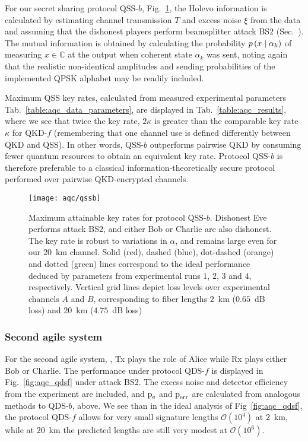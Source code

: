 For our secret sharing protocol QSS-$b$, Fig.~\ref{fig:aqc_qssb}, the Holevo information is calculated by estimating channel transmission $T$ and excess noise $\xi$ from the data and assuming that the dishonest players perform beamsplitter attack BS$2$ (Sec.~). The mutual information is obtained by calculating the probability $p\left(x \; \middle| \; \alpha_k\right)$ of measuring $x \in \mathbb{C}$ at the output when coherent state $\alpha_k$ was sent, noting again that the realistic non-identical amplitudes and sending probabilities of the implemented QPSK alphabet may be readily included.

Maximum QSS key rates, calculated from measured experimental parameters Tab.~\ref{table:aqc_data_parameters}, are displayed in Tab.~\ref{table:aqc_results}, where we see that twice the key rate, $2 \kappa$ is greater than the comparable key rate $\kappa$ for QKD-$f$ (remembering that one channel use is defined differently between QKD and QSS). In other words, QSS-$b$ outperforms pairwise QKD by consuming fewer quantum resources to obtain an equivalent key rate. Protocol QSS-$b$ is therefore preferable to a classical information-theoretically secure protocol performed over pairwise QKD-encrypted channels. 

\begin{figure}[htp]
\centering
\texttt{[image: aqc/qssb]}
\caption{\label{fig:aqc_qssb} Maximum attainable key rates for protocol QSS-$b$. Dishonest Eve performs attack BS$2$, and either Bob or Charlie are also dishonest. The key rate is robust to variations in $\alpha$, and remains large even for our $20$~km channel. Solid (red), dashed (blue), dot-dashed (orange) and dotted (green) lines correspond to the ideal performance deduced by parameters from experimental runs $1$, $2$, $3$ and $4$, respectively. Vertical grid lines depict loss levels over experimental channels $A$ and $B$, corresponding to fiber lengths $2$~km ($0.65$~dB loss) and $20$~km ($4.75$~dB loss)}
\end{figure}

\subsubsection{Second agile system \systemF}
For the second agile system, \systemF, Tx plays the role of Alice while Rx plays either Bob or Charlie. The performance under protocol QDS-$f$ is displayed in Fig.~\ref{fig:aqc_qdsf} under attack BS$2$. The excess noise and detector efficiency from the experiment are included, and $\text{p}_{\text{e}}$ and $\text{p}_{\text{err}}$ are calculated from analogous methods to QDS-$b$, above. We see than in the ideal analysis of Fig~\ref{fig:aqc_qdsf}, the protocol QDS-$f$ allows for very small signature lengths $\mathcal{O}\left(10^4\right)$ at $2$~km, while at $20$~km the predicted lengths are still very modest at $\mathcal{O}\left(10^6\right)$.


